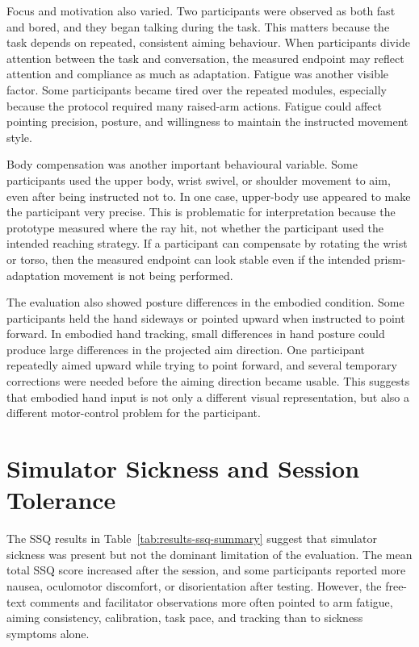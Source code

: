 Focus and motivation also varied. Two participants were observed as both fast and bored, and they began talking during the task. This matters because the task depends on repeated, consistent aiming behaviour. When participants divide attention between the task and conversation, the measured endpoint may reflect attention and compliance as much as adaptation. Fatigue was another visible factor. Some participants became tired over the repeated modules, especially because the protocol required many raised-arm actions. Fatigue could affect pointing precision, posture, and willingness to maintain the instructed movement style.

Body compensation was another important behavioural variable. Some participants used the upper body, wrist swivel, or shoulder movement to aim, even after being instructed not to. In one case, upper-body use appeared to make the participant very precise. This is problematic for interpretation because the prototype measured where the ray hit, not whether the participant used the intended reaching strategy. If a participant can compensate by rotating the wrist or torso, then the measured endpoint can look stable even if the intended prism-adaptation movement is not being performed.

The evaluation also showed posture differences in the embodied condition. Some participants held the hand sideways or pointed upward when instructed to point forward. In embodied hand tracking, small differences in hand posture could produce large differences in the projected aim direction. One participant repeatedly aimed upward while trying to point forward, and several temporary corrections were needed before the aiming direction became usable. This suggests that embodied hand input is not only a different visual representation, but also a different motor-control problem for the participant.

\section{Simulator Sickness and Session Tolerance}
\label{sec:discussion-ssq}

The SSQ results in Table~\ref{tab:results-ssq-summary} suggest that simulator sickness was present but not the dominant limitation of the evaluation. The mean total SSQ score increased after the session, and some participants reported more nausea, oculomotor discomfort, or disorientation after testing. However, the free-text comments and facilitator observations more often pointed to arm fatigue, aiming consistency, calibration, task pace, and tracking than to sickness symptoms alone.


